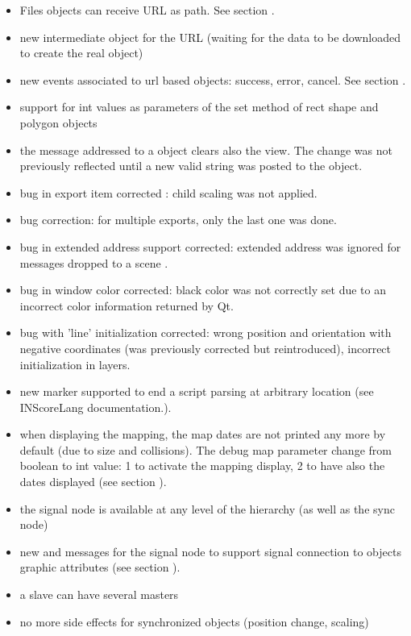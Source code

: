 \begin{itemize}
\item  Files objects can receive URL as path. See section .
\item new intermediate object for the URL (waiting for the data to be downloaded to create the real object)
\item new events associated to url based objects: success, error, cancel. See section .
\item  support for int values as parameters of the set method of rect shape and polygon objects
\item  the  message addressed to a  object clears also the view. The change was not previously reflected until a new valid string was posted to the object.


\item bug in export item corrected : child scaling was not applied.
\item bug correction: for multiple exports, only the last one was done.
\item bug in extended address support corrected: extended address was ignored for messages dropped to a scene .
\item bug in window color corrected: black color was not correctly set due to an incorrect color 
  information returned by Qt.
\item bug with 'line' initialization corrected: wrong position and orientation with negative coordinates (was previously corrected but reintroduced), incorrect initialization in layers.

\end{itemize}

\begin{itemize}
\item  new  marker supported to end a script parsing at arbitrary location  (see INScoreLang documentation.).
\item  when displaying the mapping, the map dates are not printed any more by default (due to size and collisions).  The debug map parameter change from boolean to int value: 1 to activate the mapping display, 
2 to have also the dates displayed  (see section ).
\item the signal node is available at any level of the hierarchy (as well as the sync node)
\item new  and  messages for the signal node to support signal connection to objects graphic attributes (see section ).
\item a slave can have several masters
\item no more side effects for synchronized objects (position change, scaling)
\end{itemize}

